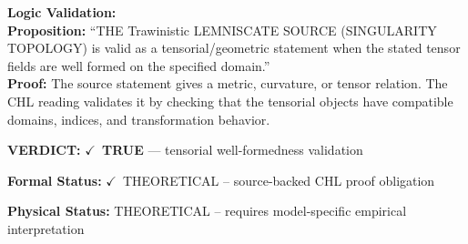 \textbf{Logic Validation:}\\
\textbf{Proposition:} ``THE Trawinistic LEMNISCATE SOURCE (SINGULARITY TOPOLOGY) is valid as a
tensorial/geometric statement when the stated tensor fields are well formed on the
specified domain.''\\
\textbf{Proof:} The source statement gives a metric, curvature, or tensor relation. The CHL reading
validates it by checking that the tensorial objects have compatible domains, indices,
and transformation behavior.

\textbf{VERDICT:} \ensuremath{\checkmark}\ \textbf{TRUE} --- tensorial well-formedness validation

\textbf{Formal Status:} \ensuremath{\checkmark}\ THEORETICAL -- source-backed CHL proof obligation

\textbf{Physical Status:} THEORETICAL -- requires model-specific empirical interpretation
\par\vspace{0.45em}
\par
\ifTZPDarkEdition
{}
\fi
\endgroup
\endgroup
